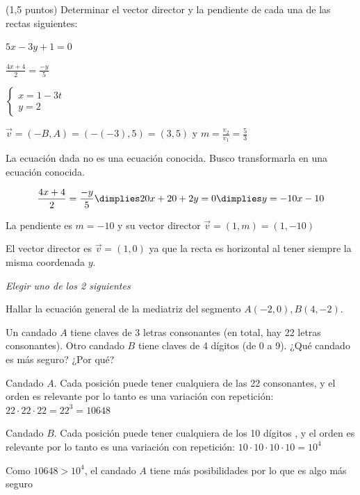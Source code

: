 \documentclass[palatino,nosec,nobuildate]{Docencia}
\begin{document}
\begin{problem} (1,5 puntos) Determinar el vector director y la pendiente de cada una de las rectas siguientes:

\ppart $5x-3y+1=0$

\ppart $\frac{4x+4}{2} = \frac{-y}{5}$

\ppart $\left\{\begin{array}{c} x=1-3t\\y=2\end{array}\right.$
\solution

\spart $\vec{v} = (-B,A) = (-(-3),5) = (3,5)$ y $m=\frac{v_2}{v_1} = \frac{5}{3}$

\spart La ecuación dada no es una ecuación conocida. Busco transformarla en una ecuación conocida. 

\[\frac{4x+4}{2} = \frac{-y}{5} \dimplies 20x+20+2y=0 \dimplies y=-10x-10\]

La pendiente es $m=-10$ y su vector director $\vec{v} = (1,m) = (1,-10)$

\spart El vector director es $\vec{v} = (1,0)$ ya que la recta es horizontal al tener siempre la misma coordenada $y$.

\end{problem}

\textit{Elegir uno de los 2 siguientes}
\begin{problem}
\ppart Hallar la ecuación general de la mediatriz del segmento $A(-2,0), B(4,-2)$.

\ppart Un candado $A$ tiene claves de 3 letras consonantes (en total, hay 22 letras consonantes). Otro candado $B$ tiene claves de 4 dígitos (de 0 a 9). ¿Qué candado es más seguro? ¿Por qué?
\solution

\spart 

\spart Candado $A$. Cada posición puede tener cualquiera de las 22 consonantes, y el orden es relevante por lo tanto es una variación con repetición: $22·22·22 = 22^3 = 10648$

Candado $B$. Cada posición puede tener cualquiera de los 10 dígitos , y el orden es relevante por lo tanto es una variación con repetición: $10·10·10·10=10^4$

Como $10648>10^4$, el candado $A$ tiene más posibilidades por lo que es algo más seguro

\end{problem}
\end{document}
